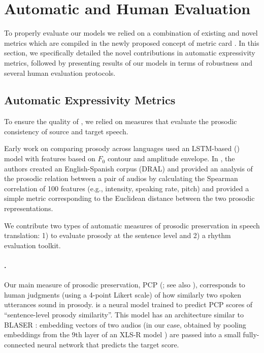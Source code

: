 \section{Automatic and Human Evaluation}\label{sec:eval}


To properly evaluate our models we relied on a combination of existing and novel metrics which are compiled in the newly proposed concept of metric card . In this section, we specifically detailed the novel contributions in automatic expressivity metrics, followed by presenting results of our models in terms of robustness and several human evaluation protocols.

\subsection{Automatic Expressivity Metrics}

\label{sec:expressivity_metrics}
To ensure the quality of \seamlessexpressive, we relied on measures that evaluate the prosodic consistency of source and target speech.


Early work on comparing prosody across languages \citep{cummins:prosody} used an LSTM-based (\cite{hochreiter:lstm}) model with features based on $F_0$ contour and amplitude envelope.
In \cite{ward2023dral,avila2023prosody}, the authors created an English-Spanish corpus (DRAL) and provided an analysis of the prosodic relation between a pair of audios by calculating the Spearman correlation of 100 features (e.g., intensity, speaking rate, pitch) and provided a simple metric corresponding to the Euclidean distance between the two prosodic representations.

We contribute two types of automatic measures of prosodic preservation in speech translation: 1) \comparator to evaluate prosody at the sentence level and 2) a rhythm evaluation toolkit.

\paragraph{\comparator.}  
\label{sec:comparator}
Our main measure of prosodic preservation, PCP (\citet{huang2023holistic}; see also ), corresponds to human judgments (using a 4-point Likert scale) of how similarly two spoken utterances sound in prosody. \comparator is a neural model trained to predict PCP scores of ``sentence-level prosody similarity''. This model has an architecture similar to BLASER \citep{chen-etal-2023-blaser}: embedding vectors of two audios (in our case, obtained by pooling embeddings from the 9th layer of an XLS-R model \citep{conneau2020unsupervised}) are passed into a small fully-connected neural network that predicts the target score. 

